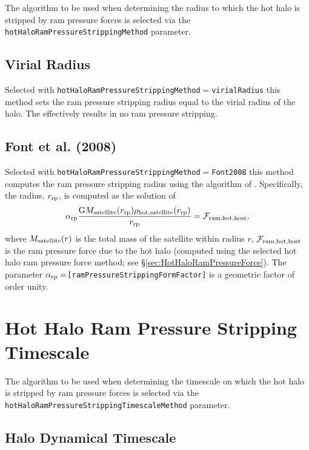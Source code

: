 The algorithm to be used when determining the radius to which the hot halo is stripped by ram pressure forces is selected via the {\tt hotHaloRamPressureStrippingMethod} parameter.

\subsection{Virial Radius}

Selected with {\tt hotHaloRamPressureStrippingMethod}$=${\tt virialRadius} this method sets the ram pressure stripping radius equal to the virial radius of the halo. The effectively results in no ram pressure stripping.

\subsection{Font et al. (2008)}

Selected with {\tt hotHaloRamPressureStrippingMethod}$=${\tt Font2008} this method computes the ram pressure stripping radius using the algorithm of \cite{font_colours_2008}. Specifically, the radius, $r_{\rm rp}$, is computed as the solution of
\begin{equation}
\alpha_{\rm rp} {{\rm G} M_{\rm satellite}(r_{\rm rp}) \rho_{\rm hot, satellite}(r_{\rm rp}) \over r_{\rm rp} } = \mathcal{F}_{\rm ram, hot, host},
\end{equation}
where $M_{\rm satellite}(r)$ is the total mass of the satellite within radius $r$, $\mathcal{F}_{\rm ram, hot, host}$ is the ram pressure force due to the hot halo (computed using the selected hot halo ram pressure force method; see \S\ref{sec:HotHaloRamPressureForce}). The parameter $\alpha_{\rm rp}=${\tt [ramPressureStrippingFormFactor]} is a geometric factor of order unity.

\section{Hot Halo Ram Pressure Stripping Timescale}

The algorithm to be used when determining the timescale on which the hot halo is stripped by ram pressure forces is selected via the {\tt hotHaloRamPressureStrippingTimescaleMethod} parameter.

\subsection{Halo Dynamical Timescale}


